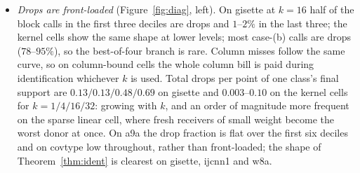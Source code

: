 \begin{itemize}
$T(k)=T(1)(1+\hat\eta(k-1))/k$ predicted from the single-pair run
(\texttt{src/model\_predictions.py}), are within $13\%$ of the
measurements at $k\le4$ and within $7\%$ on gisette at every $k$; at
$k=16$--$32$ on the kernel cells they are $9$--$41\%$ too high, because
the runs need fewer iterations than the one-state ratio predicts: the
trajectory effect is in the block's favour there. On gisette the model
predicts too few iterations ($457$ against $831$ at $k=16$, with drops a
third of the calls), but columns dominate the time.
\item \emph{Drops are front-loaded} (Figure~\ref{fig:diag}, left). On
gisette at $k=16$ half of the block calls in the first three deciles are
drops and $1$--$2\%$ in the last three; the kernel cells show the same
shape at lower levels; most case-(b) calls are drops ($78$--$95\%$), so
the best-of-four branch is rare. Column misses follow the same curve, so on
column-bound cells the whole column bill is paid during identification
whichever $k$ is used. Total drops per point of one class's final
support are $0.13/0.13/0.48/0.69$ on gisette and $0.003$--$0.10$ on the
kernel cells for $k=1/4/16/32$: growing with $k$, and an order of
magnitude more frequent on the sparse linear cell, where fresh
receivers of small weight become the worst donor at once. On a9a the drop fraction is flat over the first six deciles and on
covtype low throughout, rather than front-loaded; the shape of Theorem~\ref{thm:ident} is clearest on
gisette, ijcnn1 and w8a.
\end{itemize}
